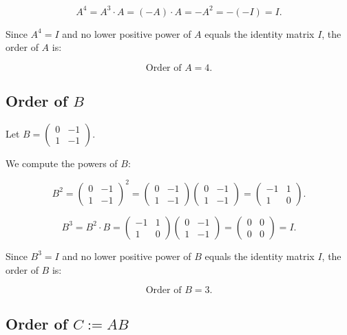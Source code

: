 \documentclass[12pt]{amsart}
\theoremstyle{definition}
\numberwithin{equation}{section}
\begin{document}
\begin{exercise}{5}
    \[
    A^4 = A^3 \cdot A = (-A) \cdot A = -A^2 = -(-I) = I.
    \]
    
    Since \(A^4 = I\) and no lower positive power of \(A\) equals the identity matrix \(I\), the order of \(A\) is:
    
    \[
    \text{Order of } A = 4.
    \]
    
    \subsection*{Order of \(B\)}
    
    Let \(B = \begin{pmatrix} 0 & -1 \\ 1 & -1 \end{pmatrix}\).
    
    We compute the powers of \(B\):
    
    \[
    B^2 = \begin{pmatrix} 0 & -1 \\ 1 & -1 \end{pmatrix}^2 = \begin{pmatrix} 0 & -1 \\ 1 & -1 \end{pmatrix} \begin{pmatrix} 0 & -1 \\ 1 & -1 \end{pmatrix} = \begin{pmatrix} -1 & 1 \\ 1 & 0 \end{pmatrix}.
    \]
    
    \[
    B^3 = B^2 \cdot B = \begin{pmatrix} -1 & 1 \\ 1 & 0 \end{pmatrix} \begin{pmatrix} 0 & -1 \\ 1 & -1 \end{pmatrix} = \begin{pmatrix} 0 & 0 \\ 0 & 0 \end{pmatrix} = I.
    \]
    
    Since \(B^3 = I\) and no lower positive power of \(B\) equals the identity matrix \(I\), the order of \(B\) is:
    
    \[
    \text{Order of } B = 3.
    \]
    
    \subsection*{Order of \(C := AB\)}
    

\end{exercise}
\end{document}
